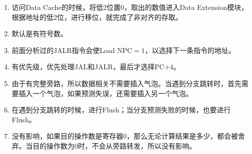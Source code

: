 \documentclass[UTF8,zihao=-4]{ctexart}
\begin{document}
\begin{enumerate}
		\item 访问Data Cache的时候，将低2位置0，取出的数值进入Data Extension模块，根据地址的低2位，进行移位，就完成了非对齐的存取。
		
		\item 默认是有符号数。
		
		\item 前面分析过的JALR指令会使Load NPC$=1$，以选择下一条指令的地址。
		
		\item 有优先级，优先处理JAL和JALR，最后才选择PC$+4$。
		
		\item 由于有完整旁路，所以数据相关不需要插入气泡。当遇到分支跳转时，首先需要插入一个气泡，如果预测失误，还需要插入另一个气泡。
		
		\item 在遇到分支跳转的时候，进行Flush；当分支预测失败的时候，也要进行Flush。
		
		\item 没有影响，如果目的操作数是寄存器0，那么无论计算结果是多少，都会被舍弃。当目的操作数为0时，不会从旁路转发，所以没有影响。
	\end{enumerate}
\end{document}
